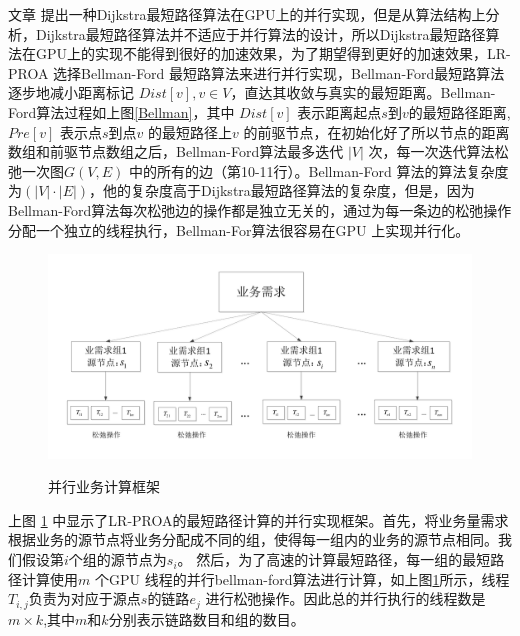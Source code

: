 文章 \cite{SSP1}提出一种Dijkstra最短路径算法在GPU上的并行实现，但是从算法结构上分析，Dijkstra最短路径算法并不适应于并行算法的设计，所以Dijkstra最短路径算法在GPU上的实现不能得到很好的加速效果，为了期望得到更好的加速效果，LR-PROA 选择Bellman-Ford \cite{NetworkFlow}最短路算法来进行并行实现，Bellman-Ford最短路算法逐步地减小距离标记 $Dist[v],v\in V$，直达其收敛与真实的最短距离。Bellman-Ford算法过程如上图\ref{Bellman}，其中 $Dist[v]$ 表示距离起点$s$到$v$的最短路径距离,$Pre[v]$ 表示点$s$到点$v$ 的最短路径上$v$ 的前驱节点，在初始化好了所以节点的距离数组和前驱节点数组之后，Bellman-Ford算法最多迭代 $|V|$ 次，每一次迭代算法松弛一次图$G(V, E)$ 中的所有的边（第10-11行）。Bellman-Ford 算法的算法复杂度为$(|V|\cdot |E|)$，他的复杂度高于Dijkstra最短路径算法的复杂度，但是，因为Bellman-Ford算法每次松弛边的操作都是独立无关的，通过为每一条边的松弛操作分配一个独立的线程执行，Bellman-For算法很容易在GPU 上实现并行化。
\begin{figure}
\setlength{\belowcaptionskip}{-0.5cm}
  \begin{center}
    {\includegraphics[width=1 \textwidth]{figures/paframework.pdf}}
    \end{center}
  \caption{{\footnotesize{并行业务计算框架}}}
  \label{ParFramework}
\end{figure}

上图 \ref{ParFramework} 中显示了LR-PROA的最短路径计算的并行实现框架。首先，将业务量需求根据业务的源节点将业务分配成不同的组，使得每一组内的业务的源节点相同。我们假设第$i$个组的源节点为$s_i$。 然后，为了高速的计算最短路径，每一组的最短路径计算使用$m$ 个GPU 线程的并行bellman-ford算法进行计算，如上图\ref{ParFramework}所示，线程$T_{i,j}$负责为对应于源点$s$的链路$e_{j}$ 进行松弛操作。因此总的并行执行的线程数是$m \times k$,其中$m$和$k$分别表示链路数目和组的数目。

